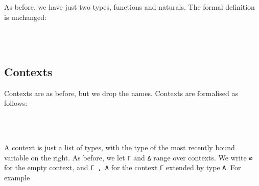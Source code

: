 As before, we have just two types, functions and naturals. The formal
definition is unchanged:

\begin{fence}
\begin{code}%
\>[0]\AgdaSpace{}%
\AgdaSpace{}%
\AgdaSymbol{:}\AgdaSpace{}%
\AgdaSpace{}%
\<%
\\
\>[0][@{}l@{\AgdaIndent{0}}]%
\>[2]\AgdaSpace{}%
\AgdaSymbol{:}\AgdaSpace{}%
\AgdaSpace{}%
\AgdaSpace{}%
\AgdaSpace{}%
\AgdaSpace{}%
\<%
\\
%
\>[2]%
\>[6]\AgdaSymbol{:}\AgdaSpace{}%
\<%
\end{code}
\end{fence}

\hypertarget{contexts}{%
\subsection{Contexts}\label{contexts}}

Contexts are as before, but we drop the names. Contexts are formalised
as follows:

\begin{fence}
\begin{code}%
\>[0]\AgdaSpace{}%
\AgdaSpace{}%
\AgdaSymbol{:}\AgdaSpace{}%
\AgdaSpace{}%
\<%
\\
\>[0][@{}l@{\AgdaIndent{0}}]%
\>[2]%
\>[6]\AgdaSymbol{:}\AgdaSpace{}%
\<%
\\
%
\>[2]\AgdaOperator{\AgdaInductiveConstructor{\AgdaUnderscore{},\AgdaUnderscore{}}}\AgdaSpace{}%
\AgdaSymbol{:}\AgdaSpace{}%
\AgdaSpace{}%
\AgdaSpace{}%
\AgdaSpace{}%
\AgdaSpace{}%
\<%
\end{code}
\end{fence}

A context is just a list of types, with the type of the most recently
bound variable on the right. As before, we let \texttt{Γ} and \texttt{Δ}
range over contexts. We write \texttt{∅} for the empty context, and
\texttt{Γ\ ,\ A} for the context \texttt{Γ} extended by type \texttt{A}.
For example

